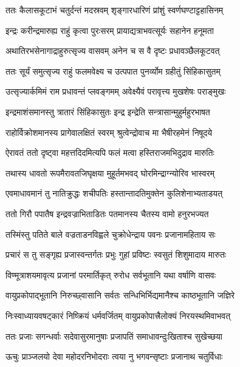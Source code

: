 \twolineshloka
{ततः कैलासकूटाभं चतुर्दन्तं मदस्रवम्}
{शृङ्गारधारिणं प्रांशुं स्वर्णघण्टाट्टहासिनम्} %

\twolineshloka
{इन्द्रः करीन्द्रमारुह्य राहुं कृत्वा पुरःसरम्}
{प्रायाद्यत्राभवत्सूर्यः सहानेन हनूमता} %

\twolineshloka
{अथातिरभसेनागाद्राहुरुत्सृज्य वासवम्}
{अनेन च स वै दृष्टः प्रधावञ्छैलकूटवत्} %

\twolineshloka
{ततः सूर्यं समुत्सृज्य राहुं फलमवेक्ष्य च}
{उत्पपात पुनर्व्योम ग्रहीतुं सिंहिकासुतम्} %

\twolineshloka
{उत्सृज्यार्कमिमं राम प्रधावन्तं प्लवङ्गमम्}
{अवेक्ष्यैवं परावृत्त्य मुखशेषः पराङ्मुखः} %

\twolineshloka
{इन्द्रमाशंसमानस्तु त्रातारं सिंहिकासुतः}
{इन्द्र इन्द्रेति सन्त्रासान्मुहुर्महुरभाषत} %

\twolineshloka
{राहोर्विक्रोशमानस्य प्रागेवालक्षितं स्वरम्}
{श्रुत्वेन्द्रोवाच मा भैषीरहमेनं निषूदये} %

\twolineshloka
{ऐरावतं ततो दृष्ट्वा महत्तदिदमित्यपि}
{फलं मत्वा हस्तिराजमभिदुद्राव मारुतिः} %

\twolineshloka
{तथास्य धावतो रूपमैरावतजिघृक्षया}
{मुहूर्तमभवद् घोरमिन्द्राग्न्योरिव भास्वरम्} %

\twolineshloka
{एवमाधावमानं तु नातिक्रुद्धः शचीपतिः}
{हस्तान्तादतिमुक्तेन कुलिशेनाभ्यताडयत्} %

\twolineshloka
{ततो गिरौ पपातैष इन्द्रवज्राभिताडितः}
{पतमानस्य चैतस्य वामो हनुरभज्यत} %

\twolineshloka
{तस्मिंस्तु पतिते बाले वज्रताडनविह्वले}
{चुक्रोधेन्द्राय पवनः प्रजानामहिताय सः} %

\twolineshloka
{प्रचारं स तु सङ्गृह्य प्रजास्वन्तर्गतः प्रभुः}
{गुहां प्रविष्टः स्वसुतं शिशुमादाय मारुतः} %

\twolineshloka
{विण्मूत्राशयमावृत्य प्रजानां परमार्तिकृत्}
{रुरोध सर्वभूतानि यथा वर्षाणि वासवः} %

\twolineshloka
{वायुप्रकोपाद्भूतानि निरुच्छ्वासानि सर्वतः}
{सन्धिभिर्भिद्यमानैश्च काष्ठभूतानि जज्ञिरे} %

\twolineshloka
{निःस्वाध्यायवषट्कारं निष्क्रियं धर्मवर्जितम्}
{वायुप्रकोपात्त्रैलोक्यं निरयस्थमिवाभवत्} %

\twolineshloka
{ततः प्रजाः सगन्धर्वाः सदेवासुरमानुषाः}
{प्रजापतिं समाधावन्दुःखिताश्च सुखेच्छया} %

\twolineshloka
{ऊचुः प्राञ्जलयो देवा महोदरनिभोदराः}
{त्वया नु भगवन्सृष्टाः प्रजानाथ चतुर्विधाः} %


